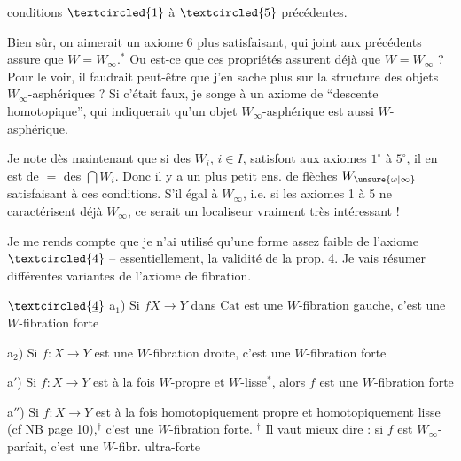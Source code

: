 
conditions $\textcircled{1}$ à $\textcircled{5}$ précédentes.


Bien sûr, on aimerait un axiome 6 plus satisfaisant, qui joint aux précédents assure que $W=W_\infty$.$^*$ Ou est-ce que ces propriétés assurent déjà que $W=W_\infty$ ? Pour le voir, il faudrait peut-être que j'en sache plus sur la structure des objets $W_\infty$-asphériques ? Si c'était faux, je songe à un axiome de ``descente homotopique'', qui indiquerait qu'un objet $W_\infty$-asphérique est aussi $W$-asphérique.

Je note dès maintenant que si des $W_i$, $i\in I$, satisfont aux axiomes $1^\circ$ à $5^\circ$, il en est de $=$ des $\bigcap W_i$. Donc il y a un plus petit ens. de flèches $W_{\unsure{\omega|\infty}}$ satisfaisant à ces conditions. S'il  égal à $W_\infty$, i.e. si les axiomes 1 à 5 ne caractérisent déjà $W_\infty$, ce serait un  localiseur vraiment très intéressant !


Je me rends compte que je n'ai utilisé qu'une forme assez faible de l'axiome $\textcircled{4}$ -- essentiellement, la validité de la prop. 4. Je vais résumer différentes variantes de l'axiome de fibration.

$\textcircled{\underline{4}}$ a$_1$) Si $f$\unsure{$:$|$\in$}$X\to Y$ dans $\mathrm{Cat}$ est une $W$-fibration gauche, c'est une $W$-fibration  forte

a$_2$) Si $f:X\to Y$ est une $W$-fibration droite, c'est une $W$-fibration  forte

a$'$) Si $f:X\to Y$ est  à la fois $W$-propre et $W$-lisse$^*$, alors $f$ est une $W$-fibration  forte


a$''$) Si $f:X\to Y$ est à la fois homotopiquement propre et homotopiquement lisse (cf NB page 10),$^{\dagger}$ c'est une $W$-fibration  forte. $^{\dagger}$ Il vaut mieux dire : si $f$ est $W_\infty$-parfait, c'est une $W$-fibr. ultra-forte

